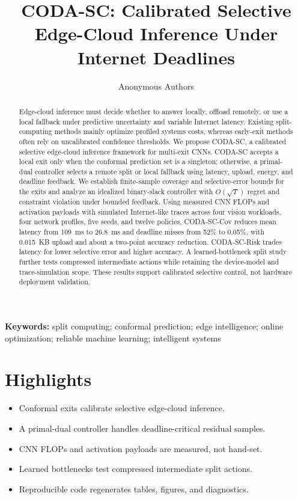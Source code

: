 \documentclass[11pt]{article}
\title{CODA-SC: Calibrated Selective Edge-Cloud Inference Under Internet Deadlines}
\author{Anonymous Authors}
\date{}
\newcommand{\CodaMean}{26.8}
\newcommand{\CodaPmiss}{0.05}
\newcommand{\CodaUpload}{0.015}
\newcommand{\CloudMean}{109}
\newcommand{\CloudPmiss}{52}
\begin{document}
\maketitle

\begin{abstract}
Edge-cloud inference must decide whether to answer locally, offload remotely, or
use a local fallback under predictive uncertainty and variable Internet latency.
Existing split-computing methods mainly optimize profiled systems costs, whereas
early-exit methods often rely on uncalibrated confidence thresholds. We propose
CODA-SC, a calibrated selective edge-cloud inference framework for multi-exit
CNNs. CODA-SC accepts a local exit only when the conformal prediction set is a
singleton; otherwise, a primal-dual controller selects a remote split or local
fallback using latency, upload, energy, and deadline feedback. We establish
finite-sample coverage and selective-error bounds for the exits and analyze an
idealized binary-slack controller with $O(\sqrt{T})$ regret and constraint
violation under bounded feedback. Using measured CNN FLOPs and activation
payloads with simulated Internet-like traces across four vision workloads, four
network profiles, five seeds, and twelve policies, CODA-SC-Cov reduces mean
latency from \CloudMean~ms to \CodaMean~ms and deadline misses from
\CloudPmiss\% to \CodaPmiss\%, with \CodaUpload~KB upload and about a two-point
accuracy reduction. CODA-SC-Risk trades latency for lower selective error and
higher accuracy. A learned-bottleneck split study further tests compressed
intermediate actions while retaining the device-model and trace-simulation
scope. These results support calibrated selective control, not hardware
deployment validation.
\end{abstract}

\noindent\textbf{Keywords:} split computing; conformal prediction; edge
intelligence; online optimization; reliable machine learning; intelligent
systems

\section*{Highlights}
\begin{itemize}
    \item Conformal exits calibrate selective edge-cloud inference.
    \item A primal-dual controller handles deadline-critical residual samples.
    \item CNN FLOPs and activation payloads are measured, not hand-set.
    \item Learned bottlenecks test compressed intermediate split actions.
    \item Reproducible code regenerates tables, figures, and diagnostics.
\end{itemize}
\end{document}
